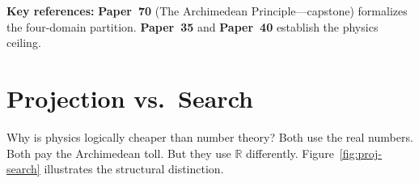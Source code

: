 \documentclass[11pt,twoside,openany]{report}
\theoremstyle{remark}
\newcommand{\paperref}[1]{\textbf{Paper~#1}}
\begin{document}
\begin{keyrefbox}
\textbf{Key references:} \paperref{70} (The Archimedean Principle---capstone) formalizes the four-domain partition. \paperref{35} and \paperref{40} establish the physics ceiling.
\end{keyrefbox}


\section{Projection vs.\ Search}

Why is physics logically cheaper than number theory? Both use the real numbers. Both pay the Archimedean toll. But they use $\mathbb{R}$ differently. Figure~\ref{fig:proj-search} illustrates the structural distinction.
\end{document}

